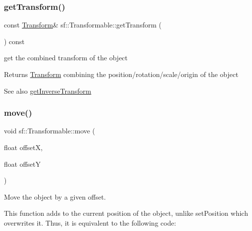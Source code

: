 \subsubsection{\texorpdfstring{getTransform()}{getTransform()}}
{\footnotesize\ttfamily const \mbox{\hyperlink{classsf_1_1_transform}{Transform}}\& sf\+::\+Transformable\+::get\+Transform (\begin{DoxyParamCaption}{ }\end{DoxyParamCaption}) const}



get the combined transform of the object 

\begin{DoxyReturn}{Returns}
\mbox{\hyperlink{classsf_1_1_transform}{Transform}} combining the position/rotation/scale/origin of the object
\end{DoxyReturn}
\begin{DoxySeeAlso}{See also}
\mbox{\hyperlink{classsf_1_1_transformable_ab18b25f51263252ff3811465eb7e9fb1}{get\+Inverse\+Transform}} \begin{DoxyVerb}\end{DoxyVerb}
 
\end{DoxySeeAlso}
\mbox{\label{classsf_1_1_transformable_a86b461d6a941ad390c2ad8b6a4a20391}} 
\subsubsection{\texorpdfstring{move()}{move()}\hspace{0.1cm}{\footnotesize\ttfamily [1/2]}}
{\footnotesize\ttfamily void sf\+::\+Transformable\+::move (\begin{DoxyParamCaption}\item[{float}]{offsetX,  }\item[{float}]{offsetY }\end{DoxyParamCaption})}



Move the object by a given offset. 

This function adds to the current position of the object, unlike set\+Position which overwrites it. Thus, it is equivalent to the following code\+: 
\begin{DoxyCode}{0}
\end{DoxyCode}



